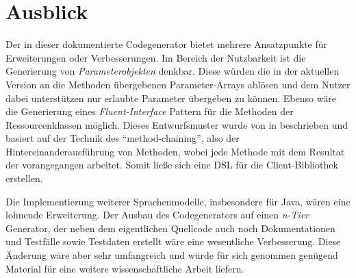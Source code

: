 \section{Ausblick}
\label{sec:prospect}


Der in dieser \thesisDesignator{} dokumentierte Codegenerator bietet mehrere Ansatzpunkte für Erweiterungen oder Verbesserungen. Im Bereich der Nutzbarkeit ist die Generierung von \emph{Parameterobjekten} denkbar. Diese würden die in der aktuellen Version an die Methoden übergebenen Parameter-Arrays ablösen und dem Nutzer dabei unterstützen nur erlaubte Parameter übergeben zu können. Ebenso wäre die Generierung eines \emph{Fluent-Interface} Pattern für die Methoden der Ressourcenklassen möglich. Dieses Entwurfsmuster wurde von \citeauthor{fowler2010domain} in \cite{fowler2010domain} beschrieben und basiert auf der Technik des \enquote{method-chaining}, also der Hintereinanderausführung von Methoden, wobei jede Methode mit dem Resultat der vorangegangen arbeitet. Somit ließe sich eine \gls{DSL} für die Client-Bibliothek erstellen.

Die Implementierung weiterer Sprachenmodelle, insbesondere für Java, wären eine lohnende Erweiterung. Der Ausbau des Codegenerators auf einen \emph{n-Tier} Generator, der neben dem eigentlichen Quellcode auch noch Dokumentationen und Testfälle sowie Testdaten erstellt wäre eine wesentliche Verbesserung. Diese Änderung wäre aber sehr umfangreich und würde für sich genommen genügend Material für eine weitere wissenschaftliche Arbeit liefern.

